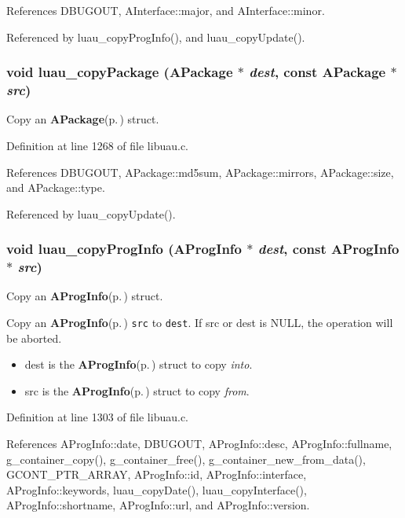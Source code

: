 References DBUGOUT, AInterface::major, and AInterface::minor.

Referenced by luau\_\-copy\-Prog\-Info(), and luau\_\-copy\-Update().
\subsubsection{\setlength{\rightskip}{0pt plus 5cm}void luau\_\-copy\-Package ({\bf APackage} $\ast$ {\em dest}, const {\bf APackage} $\ast$ {\em src})}\label{libuau_8h_a89}


Copy an {\bf APackage}{\rm (p.\,\pageref{structAPackage})} struct. 



Definition at line 1268 of file libuau.c.

References DBUGOUT, APackage::md5sum, APackage::mirrors, APackage::size, and APackage::type.

Referenced by luau\_\-copy\-Update().
\subsubsection{\setlength{\rightskip}{0pt plus 5cm}void luau\_\-copy\-Prog\-Info ({\bf AProg\-Info} $\ast$ {\em dest}, const {\bf AProg\-Info} $\ast$ {\em src})}\label{libuau_8h_a90}


Copy an {\bf AProg\-Info}{\rm (p.\,\pageref{structAProgInfo})} struct. 

Copy an {\bf AProg\-Info}{\rm (p.\,\pageref{structAProgInfo})} {\tt src} to {\tt dest}. If src or dest is NULL, the operation will be aborted.

\begin{itemize}
\item dest is the {\bf AProg\-Info}{\rm (p.\,\pageref{structAProgInfo})} struct to copy {\em into\/}. \item src is the {\bf AProg\-Info}{\rm (p.\,\pageref{structAProgInfo})} struct to copy {\em from\/}. \end{itemize}


Definition at line 1303 of file libuau.c.

References AProg\-Info::date, DBUGOUT, AProg\-Info::desc, AProg\-Info::fullname, g\_\-container\_\-copy(), g\_\-container\_\-free(), g\_\-container\_\-new\_\-from\_\-data(), GCONT\_\-PTR\_\-ARRAY, AProg\-Info::id, AProg\-Info::interface, AProg\-Info::keywords, luau\_\-copy\-Date(), luau\_\-copy\-Interface(), AProg\-Info::shortname, AProg\-Info::url, and AProg\-Info::version.
